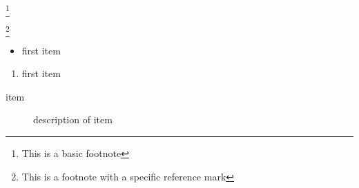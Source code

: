 \documentclass[12pt]{article}
\newcommand\"{quote}
\begin{document}

\footnote{This is a basic footnote}

\footnote [ 5 ] {This is a footnote with a specific reference mark}


\footnotemark

\footnotemark  [ 1   ]


\begin{itemize}
\item first item
\end{itemize}

\begin{enumerate}
\item first item
\end{enumerate}

\begin{description}
\item[item] description of item
\end{description}
\end{document}
